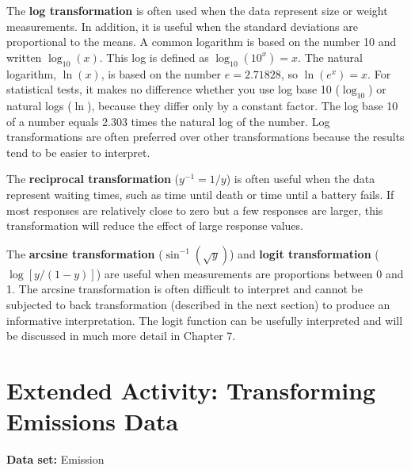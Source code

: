 \documentclass[
]{report}
\begin{document}
The \textbf{log transformation} is often used when the data represent size or weight measurements. In addition, it is useful when the standard deviations are proportional to the means. A common logarithm is based on the number 10 and written \(\log_{10}(x)\). This log is defined as \(\log_{10}(10^x) = x\). The natural logarithm, \(\ln(x)\), is based on the number \(e = 2.71828\), so \(\ln(e^x) = x\). For statistical tests, it makes no difference whether you use log base 10 (\(\log_{10}\)) or natural logs (\(\ln\)), because they differ only by a constant factor. The log base 10 of a number equals 2.303 times the natural log of the number. Log transformations are often preferred over other transformations because the results tend to be easier to interpret.

The \textbf{reciprocal transformation} (\(y^{-1} = 1/y\)) is often useful when the data represent waiting times, such as time until death or time until a battery fails. If most responses are relatively close to zero but a few responses are larger, this transformation will reduce the effect of large response values.

The \textbf{arcsine transformation} (\(\sin^{-1}(\sqrt{y})\)) and \textbf{logit transformation} (\(\log[y/(1-y)]\)) are useful when measurements are proportions between 0 and 1. The arcsine transformation is often difficult to interpret and cannot be subjected to back transformation (described in the next section) to produce an informative interpretation. The logit function can be usefully interpreted and will be discussed in much more detail in Chapter 7.

\section*{Extended Activity: Transforming Emissions Data}\label{extended-activity-transforming-emissions-data}

\textbf{Data set:} Emission
\end{document}
